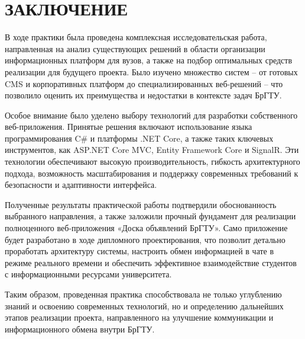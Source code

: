 \sectionbreak \section*{
	\gostTitleFont
	\redline
	ЗАКЛЮЧЕНИЕ
}

\subtitlespace

{\gostFont
	\par \redline В ходе практики была проведена комплексная исследовательская работа, направленная на анализ существующих решений в области организации информационных платформ для вузов, а также на подбор оптимальных средств реализации для будущего проекта. Было изучено множество систем – от готовых CMS и корпоративных платформ до специализированных веб-решений – что позволило оценить их преимущества и недостатки в контексте задач БрГТУ. 
	
	\par \redline Особое внимание было уделено выбору технологий для разработки собственного веб-приложения. Принятые решения включают использование языка программирования C\# и платформы .NET Core, а также таких ключевых инструментов, как ASP.NET Core MVC, Entity Framework Core и SignalR. Эти технологии обеспечивают высокую производительность, гибкость архитектурного подхода, возможность масштабирования и поддержку современных требований к безопасности и адаптивности интерфейса.
	
	\par \redline Полученные результаты практической работы подтвердили обоснованность выбранного направления, а также заложили прочный фундамент для реализации полноценного веб-приложения «Доска объявлений БрГТУ». Само приложение будет разработано в ходе дипломного проектирования, что позволит детально проработать архитектуру системы, настроить обмен информацией в чате в режиме реального времени и обеспечить эффективное взаимодействие студентов с информационными ресурсами университета.

	\par \redline Таким образом, проведенная практика способствовала не только углублению знаний и освоению современных технологий, но и определению дальнейших этапов реализации проекта, направленного на улучшение коммуникации и информационного обмена внутри БрГТУ. 
	
	\par	
}

\setcounter{subchaptercntr}{1}
\setcounter{formulacntr}{1}
\setcounter{imagecntr}{1}
